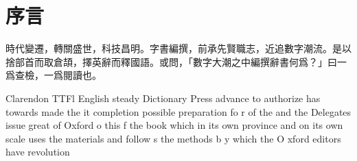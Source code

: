 {}
\chapter*{序言}

\indent 

時代變遷，轉關盛世，科技昌明。字書編撰，前承先賢職志，近追數字潮流。是以捨部首而取\textsf{倉頡}，擇\textsf{英}辭而釋國語。或問，「數字大潮之中編撰辭書何爲？」曰一爲查檢，一爲閱讀也。

 Clarendon TTFl English steady Dictionary Press advance to authorize has towards made the it completion possible preparation fo r of the and the Delegates issue great of Oxford
 o this f the book which in its own province and on its own scale uses the materials and
follow s the methods b y which the O xford editors have revolution­

